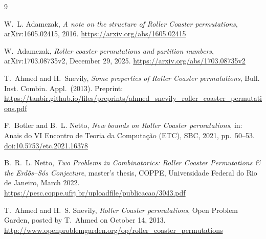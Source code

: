 \documentclass[11pt]{article}
\theoremstyle{remark}
\begin{document}
\begin{thebibliography}{9}

W.~L. Adamczak, \emph{A note on the structure of Roller Coaster permutations}, arXiv:1605.02415, 2016. \url{https://arxiv.org/abs/1605.02415}

W.~Adamczak, \emph{Roller coaster permutations and partition numbers}, arXiv:1703.08735v2, December 29, 2025. \url{https://arxiv.org/abs/1703.08735v2}

T.~Ahmed and H.~Snevily, \emph{Some properties of Roller Coaster permutations}, Bull. Inst. Combin. Appl.\ (2013). Preprint: \url{https://tanbir.github.io/files/preprints/ahmed_snevily_roller_coaster_permutations.pdf}

F.~Botler and B.~L. Netto, \emph{New bounds on Roller Coaster permutations}, in: Anais do VI Encontro de Teoria da Computa\c{c}\~ao (ETC), SBC, 2021, pp.~50--53. \href{https://doi.org/10.5753/etc.2021.16378}{doi:10.5753/etc.2021.16378}

B.~R.~L. Netto, \emph{Two Problems in Combinatorics: Roller Coaster Permutations \& the Erd\H{o}s--S\'os Conjecture}, master's thesis, COPPE, Universidade Federal do Rio de Janeiro, March 2022. \url{https://pesc.coppe.ufrj.br/uploadfile/publicacao/3043.pdf}

T.~Ahmed and H.~S. Snevily, \emph{Roller Coaster permutations}, Open Problem Garden, posted by T.~Ahmed on October 14, 2013. \url{http://www.openproblemgarden.org/op/roller_coaster_permutations}

\end{thebibliography}
\end{document}
